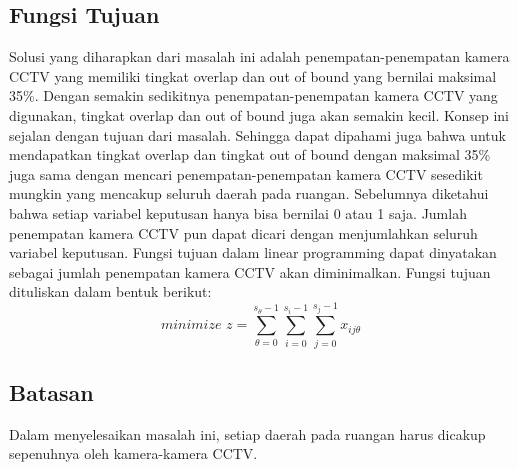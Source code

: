 \subsection{Fungsi Tujuan}
Solusi yang diharapkan dari masalah ini adalah penempatan-penempatan kamera CCTV yang memiliki tingkat overlap dan out of bound yang bernilai maksimal 35\%. Dengan semakin sedikitnya penempatan-penempatan kamera CCTV yang digunakan, tingkat overlap dan out of bound juga akan semakin kecil. Konsep ini sejalan dengan tujuan dari masalah. Sehingga dapat dipahami juga bahwa untuk mendapatkan tingkat overlap dan tingkat out of bound dengan maksimal 35\% juga sama dengan mencari penempatan-penempatan kamera CCTV sesedikit mungkin yang mencakup seluruh daerah pada ruangan. Sebelumnya diketahui bahwa setiap variabel keputusan hanya bisa bernilai 0 atau 1 saja. Jumlah penempatan kamera CCTV pun dapat dicari dengan menjumlahkan seluruh variabel keputusan. Fungsi tujuan dalam linear programming dapat dinyatakan sebagai jumlah penempatan kamera CCTV akan diminimalkan. Fungsi tujuan dituliskan dalam bentuk berikut:
\begin{equation*}
	\textit{minimize }z = \sum_{\theta=0}^{s_{\theta}-1} \sum_{i=0}^{s_i-1} \sum_{j=0}^{s_j-1} x_{ij\theta}
\end{equation*}

\subsection{Batasan}
Dalam menyelesaikan masalah ini, setiap daerah pada ruangan harus dicakup sepenuhnya oleh kamera-kamera CCTV.



















